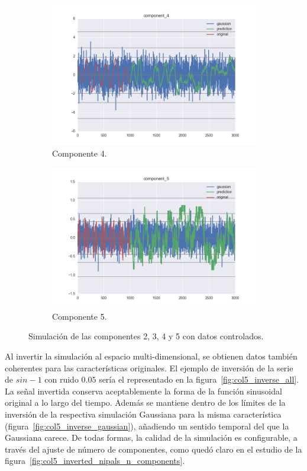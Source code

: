 \documentclass[11pt,spanish,listoffigures,listoftables]{tfgetsinf}
\begin{document}
\begin{figure}[H]
\begin{subfigure}[h]{0.49\textwidth}
            \includegraphics[width=\textwidth]{simulated_data_8_columns/component_4.png}
            \caption{Componente 4.}
            \label{fig:component_4}
        \end{subfigure}
        \begin{subfigure}[h]{0.49\textwidth}
            \centering
            \includegraphics[width=\textwidth]{simulated_data_8_columns/component_5.png}
            \caption{Componente 5.}
            \label{fig:component_5}
        \end{subfigure}
        \caption{Simulación de las componentes 2, 3, 4 y 5 con datos controlados.}
        \label{fig:component_x}
    \end{figure}
    
    Al invertir la simulación al espacio multi-dimensional, se obtienen datos también coherentes para las características originales. El ejemplo de inversión de la serie de \(sin - 1\) con ruido \(0.05\) sería el representado en la figura~\ref{fig:col5_inverse_all}. La señal invertida conserva aceptablemente la forma de la función sinusoidal original a lo largo del tiempo. Además se mantiene dentro de los límites de la inversión de la respectiva simulación Gaussiana para la misma característica (figura~\ref{fig:col5_inverse_gaussian}), añadiendo un sentido temporal del que la Gaussiana carece. De todas formas, la calidad de la simulación es configurable, a través del ajuste de número de componentes, como quedó claro en el estudio de la figura~\ref{fig:col5_inverted_nipals_n_components}.
\end{document}
